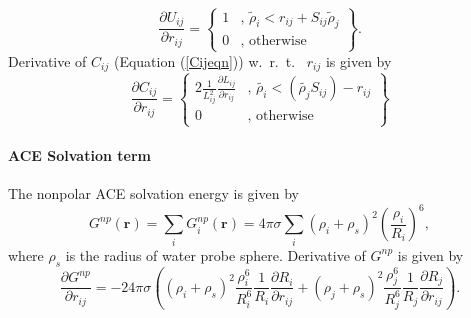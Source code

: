 \documentclass[12pt]{article}
\begin{document}
\begin{equation}
\frac{\partial U_{ij}}{\partial r_{ij}} = \left\{ \begin{array}{rl}
    1 &\mbox{, $\tilde{\rho}_{i} < r_{ij} + S_{ij}\tilde{\rho}_{j}$} \\
    0 &\mbox{, otherwise}
    \end{array} \right\}.
\end{equation}
Derivative of $C_{ij}$ (Equation (\ref{Cijeqn})) w.~r.~t.~ $r_{ij}$ is given by
\begin{equation}
\frac{\partial C_{ij}}{\partial r_{ij}} = \left\{ \begin{array}{rl}
  2\frac{1}{L_{ij}^{2}}\frac{\partial L_{ij}}{\partial r_{ij}} &\mbox{, $\tilde{{\rho}_{i}} < ( \tilde{{\rho}_{j}}S_{ij}) - r_{ij}$} \\
  0 &\mbox{, otherwise}
  \end{array} \right\}
\end{equation}
\paragraph{ACE Solvation term}
The nonpolar ACE solvation energy is given by
\begin{equation}
\label{ACEsolvation}
G^{np}(\mathbf{r}) = \displaystyle\sum_{i}G_{i}^{np}(\mathbf{r}) = 4{\pi}{\sigma}\displaystyle\sum_{i}({\rho}_{i} + {\rho}_{s})^{2}(\frac{{\rho}_{i}}{R_{i}})^{6},
\end{equation}
where ${\rho}_{s}$ is the radius of water probe sphere.
Derivative of $G^{np}$ is given by
\begin{equation}
\frac{\partial G^{np}}{\partial r_{ij}} = -24{\pi}{\sigma}\left( (\rho_{i} + \rho_{s})^{2}\frac{{\rho}_{i}^{6}}{R_{i}^{6}}\frac{1}{R_{i}}\frac{\partial R_{i}}{\partial r_{ij}} + (\rho_{j} + \rho_{s})^{2}\frac{{\rho}_{j}^{6}}{R_{j}^{6}}\frac{1}{R_{j}}\frac{\partial R_{j}}{\partial r_{ij}} \right).
\end{equation}
\end{document}
